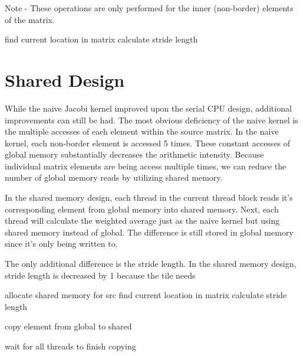 \documentclass[12pt]{article}
\begin{document}
Note - These operations are only performed for the inner (non-border) elements
of the matrix.

\vspace{1cm}
\begin{algorithm}[H]
    find current location in matrix\;
    calculate stride length\;

\end{algorithm}

\newpage
\vspace{-1.5cm}
\section{Shared Design}
\vspace{-0.25cm}

While the naive Jacobi kernel improved upon the serial CPU design,
additional improvements can still be had. The most obvious deficiency
of the naive kernel is the multiple accesses of each element within
the source matrix. In the naive kernel, each non-border 
element is accessed 5 times. These constant accesses of global memory
substantially decreases the arithmetic intensity. Because individual 
matrix elements are being access multiple times, we can reduce 
the number of global memory reads by utilizing shared memory. 

In the shared memory design, each thread in the current thread block
reads it's corresponding element from global memory into shared memory. 
Next, each thread will calculate the weighted average just as the naive 
kernel but using shared memory instead of global. The difference 
is still stored in global memory since it's only being written to.

The only additional difference is the stride length. In the shared memory
design, stride length is decreased by 1 because the tile needs 


\vspace{1cm}
\begin{algorithm}[H]
    allocate shared memory for src\;
    find current location in matrix\;
    calculate stride length\;
    
    copy element from global to shared\;

    wait for all threads to finish copying\;

\end{algorithm}
\end{document}
